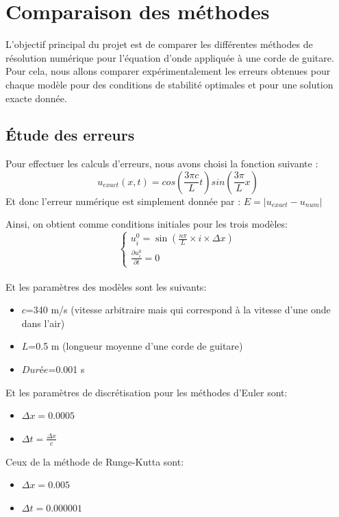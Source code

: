 \section{Comparaison des méthodes}
L'objectif principal du projet est de comparer les différentes méthodes de résolution numérique pour l'équation d'onde appliquée à une corde de guitare.
Pour cela, nous allons comparer expérimentalement les erreurs obtenues pour chaque modèle pour des conditions de stabilité optimales et pour une solution exacte donnée.

\subsection{Étude des erreurs}
Pour effectuer les calculs d'erreurs, nous avons choisi la fonction suivante :
\begin{equation*}
    u_{exact}(x,t)=cos(\frac{3 \pi c}{L}t)sin(\frac{3 \pi }{L}x )
\end{equation*}
Et donc l'erreur numérique est simplement donnée par :
     $E=|u_{exact} - u_{num}|$

Ainsi, on obtient comme conditions initiales pour les trois modèles:
  \[
      \begin{cases}
        u^{0}_{i}=\sin(\frac{n \pi }{L} \times i \times \Delta x) \\
        \frac{\partial u^0_{i}}{\partial t}= 0
      \end{cases}
    \]\\
Et les paramètres des modèles sont les suivants:
\begin{itemize}
    \item $c$=340 m/s (vitesse arbitraire mais qui correspond à la vitesse d'une onde dans l'air)
    \item $L$=0.5 m (longueur moyenne d'une corde de guitare)
    \item $Durée$=0.001 s\\ 
\end{itemize}
Et les paramètres de discrétisation pour les méthodes d'Euler sont:
\begin{itemize}
    \item $\Delta x=0.0005$
    \item $\Delta t=\frac{\Delta x}{c}$
\end{itemize}
Ceux de la méthode de Runge-Kutta sont: 
\begin{itemize}
    \item $\Delta x=0.005$
    \item $\Delta t=0.000001$
\end{itemize}

